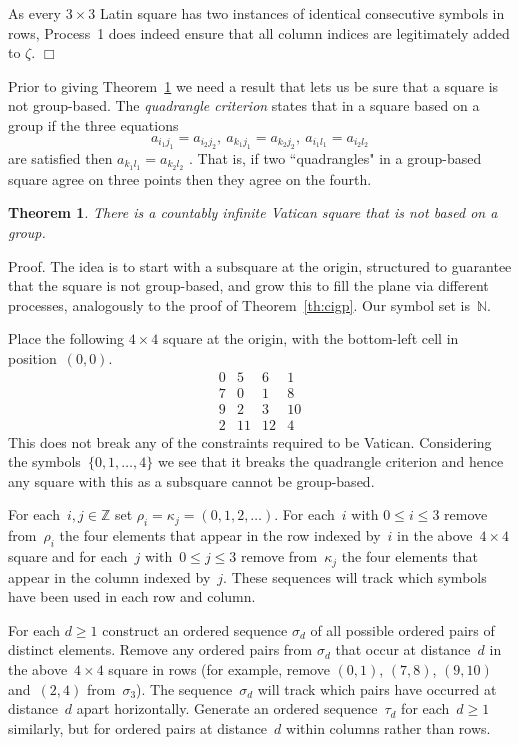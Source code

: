 \documentclass[12pt,a4paper]{article}
\newtheorem{thm}{Theorem}
\newcommand{\Z}{\mathbb{Z}}
\newcommand{\N}{\mathbb{N}}
\newcommand{\qed}{\unskip\protect\nolinebreak\mbox{\quad$\Box$}\vspace{3mm}}
\begin{document}
As every $3 \times 3$ Latin square has two instances of identical consecutive symbols in rows, Process~1 does indeed ensure that all column indices are legitimately added to $\zeta$.
\qed


Prior to giving Theorem~\ref{th:infvat} we need a result that lets us be sure that a square is not group-based.  The {\em quadrangle criterion} states that in a square based on a group if the three equations
$$a_{i_1j_1} = a_{i_2j_2}, \ a_{k_1j_1} = a_{k_2j_2}, \ a_{i_1l_1} = a_{i_2l_2}$$
are satisfied then $a_{k_1l_1} = a_{k_2l_2}$ \cite[Theorem~1.2.1]{DK}.  That is, if two ``quadrangles" in a group-based square agree on three points then they agree on the fourth.

\begin{thm}\label{th:infvat}
There is a countably infinite Vatican square that is not based on a  group.
\end{thm}

\noindent
Proof.  The  idea is to start with a subsquare at the origin, structured to guarantee that the square is not group-based, and grow this to fill the plane via different processes, analogously to the proof of Theorem~\ref{th:cigp}.  Our symbol set is~$\N$.

Place the following $4 \times 4$ square at the origin, with the bottom-left cell in position~$(0,0)$.
$$
\begin{array}{cccc}
0   &  5  & 6   &  1 \\ 
 7    & 0& 1 &  8  \\
  9  & 2  & 3 & 10 \\
2  & 11 & 12  &  4 
\end{array}
$$
This does not break any of the constraints required to be Vatican.  Considering the symbols~$\{0,1,\ldots,4\}$ we see that it breaks the quadrangle criterion and hence any square with this as a subsquare cannot be group-based.

For each~$i,j \in \Z$ set $\rho_i = \kappa_j = (0, 1,2,\ldots)$. For each~$i$ with $0 \leq i \leq 3$ remove from~$\rho_i$ the four elements that appear in the row indexed by~$i$ in the above~$4 \times 4$ square and for  each~$j$ with~$0 \leq j \leq 3$ remove from~$\kappa_j$ the four elements that appear  in the column indexed by~$j$.  These sequences will track which symbols have been used in each row and column.

For each $d \geq 1$ construct an ordered sequence $\sigma_d$ of all possible ordered pairs of distinct elements.  Remove any ordered pairs from $\sigma_d$ that occur at distance~$d$ in the above~$4 \times 4$ square in rows (for example, remove $(0,1)$, $(7,8)$, $(9,10)$ and~$(2,4)$ from~$\sigma_{3}$).  The sequence~$\sigma_d$ will track which pairs have occurred at distance~$d$ apart horizontally.   Generate an ordered sequence~$\tau_d$ for each~$d \geq 1$ similarly, but for ordered pairs at distance~$d$ within columns rather than rows.
\end{document}
